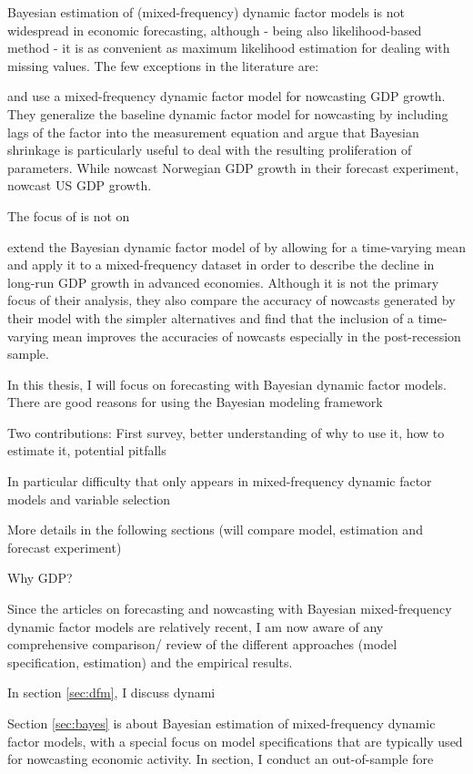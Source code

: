 
Bayesian estimation of (mixed-frequency) dynamic factor models is not widespread in economic forecasting, although - being also likelihood-based method - it is as convenient as maximum likelihood estimation for dealing with missing values. The few exceptions in the literature are:

\citet{LucianiRicci2014} and \citet{DAgostinoEtal2016} use a mixed-frequency dynamic factor model for nowcasting GDP growth. They generalize the baseline dynamic factor model for nowcasting by including lags of the factor into the measurement equation and argue that Bayesian shrinkage is particularly useful to deal with the resulting proliferation of parameters. While \citet{LucianiRicci2014} nowcast Norwegian GDP growth in their forecast experiment, \citet{DAgostinoEtal2016} nowcast US GDP growth.

The focus of \citet{MarcellinoEtal2016} is not on 

\citet{AntolinDiazEtal2017} extend the Bayesian dynamic factor model of \citet{MarcellinoEtal2016} by allowing for a time-varying mean and apply it to a mixed-frequency dataset in order to describe the decline in long-run GDP growth in advanced economies. Although it is not the primary focus of their analysis, they also compare the accuracy of nowcasts generated by their model with the simpler alternatives and find that the inclusion of a time-varying mean improves the accuracies of nowcasts especially in the post-recession sample. %


In this thesis, I will focus on forecasting with Bayesian dynamic factor models. There are good reasons for using the Bayesian modeling framework

Two contributions: First survey, better understanding of why to use it, how to estimate it, potential pitfalls

In particular difficulty that only appears in mixed-frequency dynamic factor models and variable selection

More details in the following sections (will compare model, estimation and forecast experiment)


Why GDP?

Since the articles on forecasting and nowcasting with Bayesian mixed-frequency dynamic factor models are relatively recent, I am now aware of any comprehensive comparison/ review of the different approaches (model specification, estimation) and the empirical results.


In section \ref{sec:dfm}, I discuss dynami

Section \ref{sec:bayes} is about Bayesian estimation of mixed-frequency dynamic factor models, with a special focus on model specifications that are typically used for nowcasting economic activity. %
In section, I conduct an out-of-sample fore